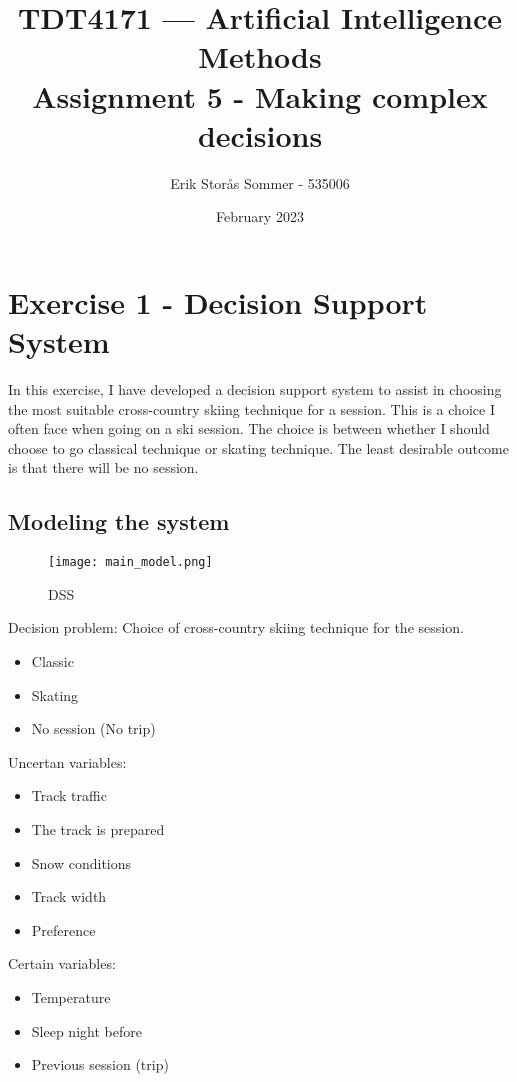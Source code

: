 \documentclass{article}
\title{TDT4171 — Artificial Intelligence Methods \\ Assignment 5 - Making complex decisions}
\author{Erik Storås Sommer - 535006}
\date{February 2023}
\begin{document}
\maketitle
\setlength{\parindent}{0pt}

\section*{Exercise 1 - Decision Support System}

In this exercise, I have developed a decision support system to assist in choosing the most suitable cross-country skiing technique for a session.
This is a choice I often face when going on a ski session.
The choice is between whether I should choose to go classical technique or skating technique. The least desirable outcome is that there will be no session.

\subsection*{Modeling the system}

\begin{figure}[h]
    \texttt{[image: main\_model.png]}
    \caption{DSS}
    \label{fig:image1}
\end{figure}

Decision problem: Choice of cross-country skiing technique for the session.
\begin{itemize}
    \item Classic
    \item Skating
    \item No session (No trip)
\end{itemize}

Uncertan variables:
\begin{itemize}
    \item Track traffic
    \item The track is prepared
    \item Snow conditions
    \item Track width
    \item Preference
\end{itemize}

Certain variables:
\begin{itemize}
    \item Temperature
    \item Sleep night before
    \item Previous session (trip)
\end{itemize}
\end{document}

